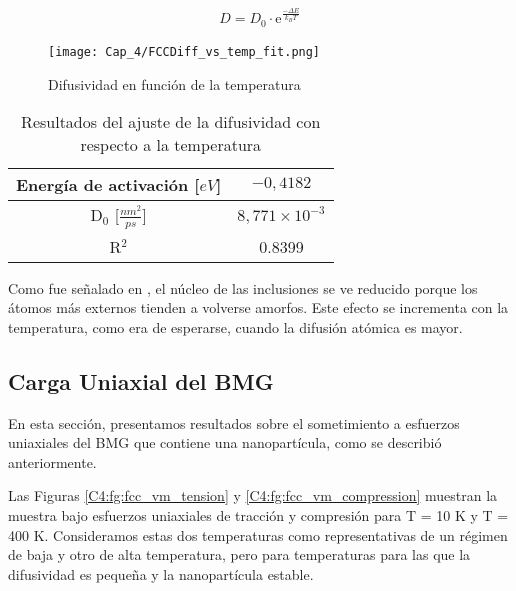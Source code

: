 \begin{eqnarray}
D = D_{0}\cdot \mathrm{e}^{\frac{-\Delta E}{k_{B} T}}
\label{C4:eq:diff_Fit}
\end{eqnarray}

\begin{figure}[htp]
\centering
\texttt{[image: Cap\_4/FCCDiff\_vs\_temp\_fit.png]}
\caption[Difusividad en función de la temperatura]{Difusividad en función de la temperatura}
\label{C4:fg:FCC_diff_vs_T}
\end{figure}

\begin{table}[htp]
\caption{Resultados del ajuste de la difusividad con respecto a la temperatura}
\begin{center}
\begin{tabular}{*{2}{c}}
\hline
Energía de activación [$eV$]& $-0,4182$ \\
\hline \hline
D$_{0}$ [$\frac{nm^{2}}{ps}$] & $8,771\times 10^{-3}$\\
\hline
R$^{2}$ & 0.8399 \\
\hline
\end{tabular}
\end{center}
\label{C4:tb:FCC_Diff_VS_T_Fit_Restults}
\end{table}

Como fue señalado en \cite{albe13}, el núcleo de las inclusiones se ve reducido porque los átomos más externos tienden a volverse amorfos. Este efecto se incrementa con la temperatura, como era de esperarse, cuando la difusión atómica es mayor.

\subsection{Carga Uniaxial del BMG}

En esta sección, presentamos resultados sobre el sometimiento a esfuerzos uniaxiales del BMG que contiene una nanopartícula, como se describió anteriormente.

Las Figuras \ref{C4:fg:fcc_vm_tension} y \ref{C4:fg:fcc_vm_compression} muestran la muestra bajo esfuerzos uniaxiales de tracción y compresión para T = 10 K y T = 400 K. Consideramos estas dos temperaturas como representativas de un régimen de baja y otro de alta temperatura, pero para temperaturas para las que la difusividad es pequeña y la nanopartícula estable.

